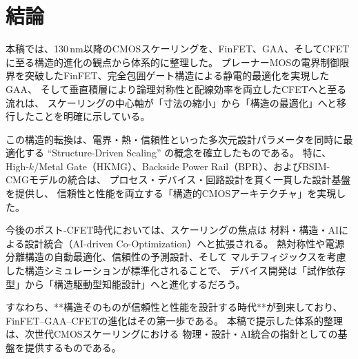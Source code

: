 \section{結論}
本稿では、130\,nm以降のCMOSスケーリングを、FinFET、GAA、そしてCFETに至る構造的進化の観点から体系的に整理した。  
プレーナーMOSの電界制御限界を突破したFinFET、完全包囲ゲート構造による静電的最適化を実現したGAA、  
そして垂直積層により論理対称性と配線効率を両立したCFETへと至る流れは、  
スケーリングの中心軸が「寸法の縮小」から「構造の最適化」へと移行したことを明確に示している。

この構造的転換は、電界・熱・信頼性といった多次元設計パラメータを同時に最適化する  
“Structure-Driven Scaling” の概念を確立したものである。  
特に、High-$k$/Metal Gate（HKMG）、Backside Power Rail（BPR）、およびBSIM-CMGモデルの統合は、  
プロセス・デバイス・回路設計を貫く一貫した設計基盤を提供し、  
信頼性と性能を両立する「構造的CMOSアーキテクチャ」を実現した。

今後のポスト-CFET時代においては、スケーリングの焦点は  
材料・構造・AIによる設計統合（AI-driven Co-Optimization）へと拡張される。  
熱対称性や電源分離構造の自動最適化、信頼性の予測設計、そして  
マルチフィジックスを考慮した構造シミュレーションが標準化されることで、  
デバイス開発は「試作依存型」から「構造駆動型知能設計」へと進化するだろう。

すなわち、**構造そのものが信頼性と性能を設計する時代**が到来しており、  
FinFET–GAA–CFETの進化はその第一歩である。  
本稿で提示した体系的整理は、次世代CMOSスケーリングにおける  
物理・設計・AI統合の指針としての基盤を提供するものである。
